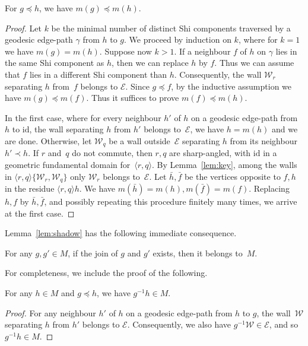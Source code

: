 \documentclass[Unicode,ALCO]{cedram}
\newcommand{\id}{\mathrm{id}}
\newcommand{\W}{\mathcal{W}}
\begin{document}
\begin{lemm} 
	\label{lem:shadow}
	For $g\preceq h$, we have $m(g)\preceq m(h)$.
\end{lemm}
\begin{proof} Let $k$ be the minimal number of distinct Shi components traversed by a geodesic edge-path $\gamma$ from $h$ to $g$. We proceed by induction on $k$, where for $k=1$ we have $m(g)=m(h)$.
	Suppose now $k>1$.
	If a neighbour $f$ of $h$ on $\gamma$ lies in the same Shi component as $h$, then we can replace $h$ by $f$. Thus we can assume that $f$ lies in a different Shi component than $h$. Consequently, the wall $\W_r$ separating $h$ from~$f$ belongs to $\mathcal E$. Since $g\preceq f$, by the inductive assumption we have $m(g)\preceq m(f)$. Thus it suffices to prove $m(f)\preceq m(h)$.
	
	In the first case, where for every neighbour $h'$ of $h$ on a geodesic edge-path from~$h$ to $\id$, the wall separating $h$ from $h'$ belongs to~$\mathcal E$, we have $h=m(h)$ and we are done. Otherwise, let $\W_q$ be a wall outside~$\mathcal E$ separating $h$ from its neighbour $h'\prec h$. 
	If $r$ and~$q$ do not commute, then $r,q$ are sharp-angled, with $\id$
	in a geometric fundamental domain for~$\langle r,q\rangle$. By Lemma~\ref{lem:key}, among the walls in $\langle r,q\rangle\{\W_r,\W_q\}$ only $\W_r$ belongs to~$\mathcal E$. Let $\bar h, \bar f$ be the vertices opposite to $f,h$ in the residue $\langle r,q\rangle h$. We have $m(\bar h)=m(h), m(\bar f)=m(f)$. Replacing $h,f$ by $\bar h,\bar f$, and possibly repeating this procedure finitely many times, we arrive at the first case.
\end{proof}

Lemma~\ref{lem:shadow} has the following immediate consequence.

\begin{coro} 
	\label{cor:Shi}
	For any $g,g'\in M$, if the join of $g$ and $g'$ exists, then it belongs to~$M$. 
\end{coro}

For completeness, we include the proof of the following.

\begin{lemm}[{\cite[Prop 4.16]{DH}}]
	\label{lem:suffix_shi}
	For any $h \in M$ and $g \preceq h$, we have $g^{-1}h \in M$.
\end{lemm}
\begin{proof}
	For any neighbour $h'$ of $h$ on a geodesic edge-path from $h$ to $g$, the wall~$\W$ separating $h$ from $h'$ belongs to $\mathcal E$. Consequently, we also have $g^{-1}\W\in \mathcal E$, and so~$g^{-1}h\in M$. 
\end{proof}
\end{document}
